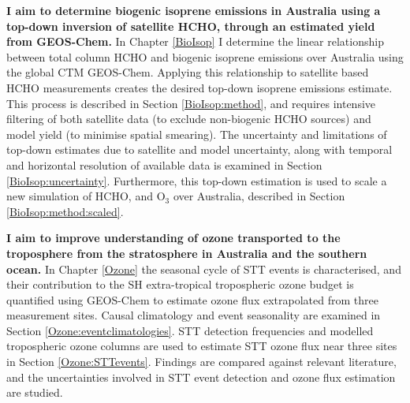   \textbf{I aim to determine biogenic isoprene emissions in Australia using a top-down inversion of satellite HCHO, through an estimated yield from GEOS-Chem.}
  In Chapter \ref{BioIsop} I determine the linear relationship between total column HCHO and biogenic isoprene emissions over Australia using the global CTM GEOS-Chem.
  Applying this relationship to satellite based HCHO measurements creates the desired top-down isoprene emissions estimate.
  This process is described in Section \ref{BioIsop:method}, and requires intensive filtering of both satellite data (to exclude non-biogenic HCHO sources) and model yield (to minimise spatial smearing).
  The uncertainty and limitations of top-down estimates due to satellite and model uncertainty, along with temporal and horizontal resolution of available data is examined in Section \ref{BioIsop:uncertainty}.
  Furthermore, this top-down estimation is used to scale a new simulation of HCHO, and O$_3$ over Australia, described in Section \ref{BioIsop:method:scaled}.
   
  \textbf{I aim to improve understanding of ozone transported to the troposphere from the stratosphere in Australia and the southern ocean.}
  In Chapter \ref{Ozone} the seasonal cycle of STT events is characterised, and their contribution to the SH extra-tropical tropospheric ozone budget is quantified using GEOS-Chem to estimate ozone flux extrapolated from three measurement sites.
  Causal climatology and event seasonality are examined in Section \ref{Ozone:eventclimatologies}.
  STT detection frequencies and modelled tropospheric ozone columns are used to estimate STT ozone flux near three sites in Section \ref{Ozone:STTevents}. 
  Findings are compared against relevant literature, and %
  the uncertainties involved in STT event detection and ozone flux estimation are studied.
  
